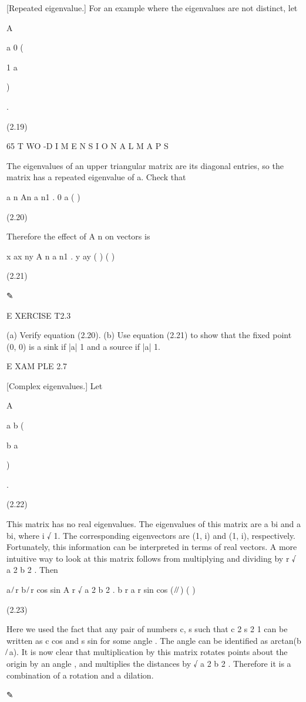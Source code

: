 \documentclass[12pt]{article}
\begin{document}
[Repeated eigenvalue.] For an example where the eigenvalues are not distinct, let

A

a 0 (

1 a

)

.

(2.19)

65 T WO -D I M E N S I O N A L M A P S

The eigenvalues of an upper triangular matrix are its diagonal entries, so the matrix has a repeated eigenvalue of a. Check that

a n An a n1 . 0 a ( )

(2.20)

Therefore the effect of A n on vectors is

x ax  ny A n a n1 . y ay ( ) ( )

(2.21)

✎

E XERCISE T2.3

(a) Verify equation (2.20). (b) Use equation (2.21) to show that the ﬁxed point (0, 0) is a sink if |a|  1 and a source if |a|  1.

E XAM PLE 2.7

[Complex eigenvalues.] Let

A

a b (

b a

)

.

(2.22)

This matrix has no real eigenvalues. The eigenvalues of this matrix are a  bi and a  bi, where i  √ 1. The corresponding 
eigenvectors are (1, i) and (1, i), respectively. Fortunately, this information can be interpreted in terms of real vectors. A more 
intuitive way to look at this matrix follows from multiplying and dividing by r  √ a 2  b 2 . Then

a ̸ r b ̸ r cos  sin A  r  √ a 2  b 2 . b r a r sin cos ( ̸ ̸ ) ( )

(2.23)

Here we used the fact that any pair of numbers c, s such that c 2  s 2  1 can be written as c  cos and s  sin for some angle . The 
angle can be identiﬁed as  arctan(b ̸ a). It is now clear that multiplication by this matrix rotates points about the origin by an 
angle , and multiplies the distances by √ a 2  b 2 . Therefore it is a combination of a rotation and a dilation.

✎
\end{document}
